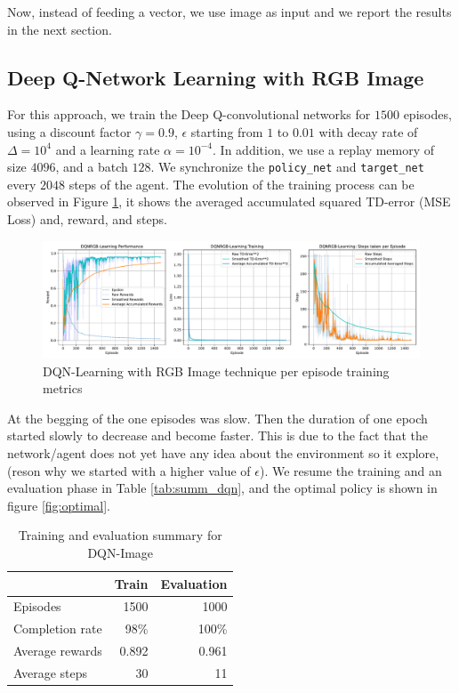 Now, instead of feeding a vector, we use image as input and we report the results in the next section.
\subsection{Deep Q-Network Learning with RGB Image}
For this approach, we train the Deep Q-convolutional networks for $1500$ episodes, using a discount factor $\gamma=0.9$, $\epsilon$ starting from $1$ to $0.01$ with decay rate of $\Delta=10^4$ and a learning rate $\alpha=10^{-4}$. In addition, we use a replay memory of size $4096$, and a batch $128$. We synchronize the \texttt{policy\_net} and \texttt{target\_net} every $2048$ steps of the agent. The evolution of the training process can be observed in Figure \ref{fig:dqn-img}, it shows the averaged accumulated squared TD-error (MSE Loss) and, reward, and steps.
\begin{figure}[H]
	\centering
	\includegraphics[width=\linewidth]{figures/DQNRGBLearning_episode.pdf}
	\caption{DQN-Learning with RGB Image technique per episode training metrics}
	\label{fig:dqn-img}
\end{figure}
At the begging of the one episodes was slow. Then the duration of one epoch started slowly to decrease and become faster. This is due to the fact that the network/agent does not yet have any idea about the environment so it explore, (reson why we started with a higher value of $\epsilon$). We resume the training and an evaluation phase in Table \ref{tab:summ_dqn}, and the optimal policy is shown in figure \ref{fig:optimal}.
\begin{table}
	\centering
	\begin{tabular}{@{}lrr@{}}
		\cmidrule(l){2-3}
		& Train & Evaluation \\ \midrule
		Episodes        &  1500      &  1000          \\
		Completion rate &   98\%    &  100\%           \\
		Average rewards &   0.892    &    0.961        \\
		Average steps   &    30   &     11       \\ \bottomrule
	\end{tabular}
	\caption{Training and evaluation summary for DQN-Image}
	\label{tab:summ-dqn-img}
\end{table}

